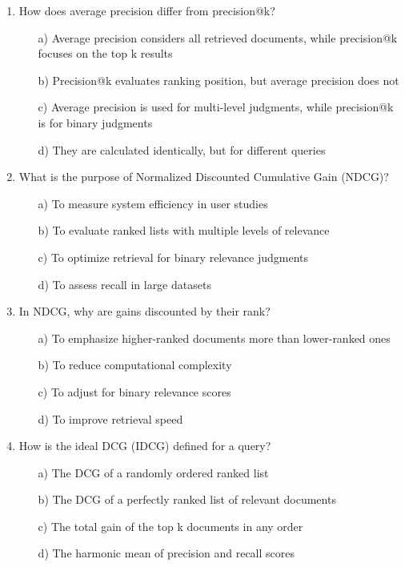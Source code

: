 \documentclass[8pt]{extarticle}
\begin{document}
\begin{multicols}{2}
\begin{enumerate}
\item How does average precision differ from precision@k?
\begin{itemize}
\item[a)] Average precision considers all retrieved documents, while precision@k focuses on the top k results
\item[b)] Precision@k evaluates ranking position, but average precision does not
\item[c)] Average precision is used for multi-level judgments, while precision@k is for binary judgments
\item[d)] They are calculated identically, but for different queries
\end{itemize}

\item What is the purpose of Normalized Discounted Cumulative Gain (NDCG)?
\begin{itemize}
\item[a)] To measure system efficiency in user studies
\item[b)] To evaluate ranked lists with multiple levels of relevance
\item[c)] To optimize retrieval for binary relevance judgments
\item[d)] To assess recall in large datasets
\end{itemize}

\item In NDCG, why are gains discounted by their rank?
\begin{itemize}
\item[a)] To emphasize higher-ranked documents more than lower-ranked ones
\item[b)] To reduce computational complexity
\item[c)] To adjust for binary relevance scores
\item[d)] To improve retrieval speed
\end{itemize}

\item How is the ideal DCG (IDCG) defined for a query?
\begin{itemize}
\item[a)] The DCG of a randomly ordered ranked list
\item[b)] The DCG of a perfectly ranked list of relevant documents
\item[c)] The total gain of the top k documents in any order
\item[d)] The harmonic mean of precision and recall scores
\end{itemize}


\end{enumerate}
\end{multicols}
\end{document}
